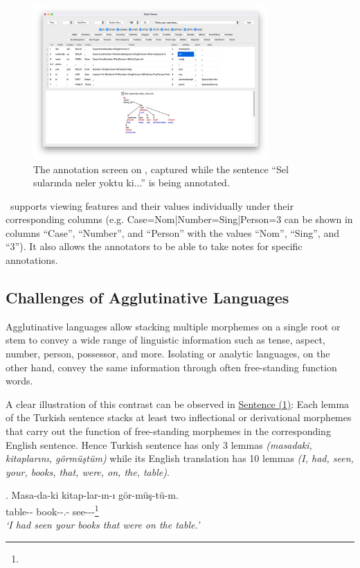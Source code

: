 \begin{figure}[th!]
    \centering
        \includegraphics[width=0.8\textwidth]{figures/boat-v1-march-sample-annotation-mac.png}
        \caption{The annotation screen on \boatvone, captured while the sentence ``Sel sularında neler yoktu ki...'' is being annotated.}
        \label{fig:anno-fig-v1}
\end{figure}

\boatvone\ supports viewing features and their values individually under their corresponding columns (e.g. Case=Nom|Number=Sing|Person=3 can be shown in columns ``Case'', ``Number'', and ``Person'' with the values ``Nom'', ``Sing'', and ``3''). It also allows the annotators to be able to take notes for specific annotations.

\subsection{Challenges of Agglutinative Languages}
\label{sec:challenges}
Agglutinative languages allow stacking multiple morphemes on a single root or stem to convey a wide range of linguistic information such as tense, aspect, number, person, possessor, and more. Isolating or analytic languages, on the other hand, convey the same information through often free-standing function words.

A clear illustration of this contrast can be observed in \hyperref[trex]{Sentence (1)}: Each lemma of the Turkish sentence stacks at least two inflectional or derivational morphemes that carry out the function of free-standing morphemes in the corresponding English sentence. Hence Turkish sentence has only 3 lemmas \textit{(masadaki, kitaplarını, görmüştüm)} while its English translation has 10 lemmas \textit{(I, had, seen, your, books, that, were, on, the, table)}. 

\ex.
\label{trex}
Masa-da-ki \hspace*{.573cm}kitap-lar-ın-ı \hspace*{1.8cm}gör-müş-tü-m.\\
table-{\sc \Loc-\Der} book-{\sc \Pl-\Poss.\Second\Sg-\Acc} see-{\sc \Ant-\Pst-\First\Sg}\footnote{\printglossaries}\\
\textit{`I had seen your books that were on the table.'}


